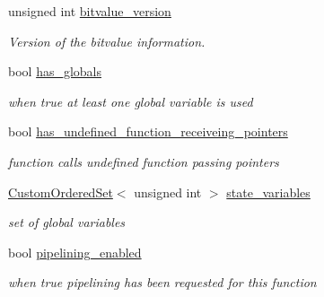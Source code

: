 \begin{DoxyCompactItemize}
unsigned int \hyperlink{classFunctionBehavior_aa15033642ac2f45870432b2ca8fae3de}{bitvalue\+\_\+version}
\begin{DoxyCompactList}\small\item\em Version of the bitvalue information. \end{DoxyCompactList}\item 
bool \hyperlink{classFunctionBehavior_a1dd60208e508751be9dc4d13c7afd1db}{has\+\_\+globals}
\begin{DoxyCompactList}\small\item\em when true at least one global variable is used \end{DoxyCompactList}\item 
bool \hyperlink{classFunctionBehavior_aa3f83e3d41707b404a4cbad317061013}{has\+\_\+undefined\+\_\+function\+\_\+receiveing\+\_\+pointers}
\begin{DoxyCompactList}\small\item\em function calls undefined function passing pointers \end{DoxyCompactList}\item 
\hyperlink{classCustomOrderedSet}{Custom\+Ordered\+Set}$<$ unsigned int $>$ \hyperlink{classFunctionBehavior_a3c944212c997d99ad71abc0afc7a72ee}{state\+\_\+variables}
\begin{DoxyCompactList}\small\item\em set of global variables \end{DoxyCompactList}\item 
bool \hyperlink{classFunctionBehavior_a8e15531441e9ce43c33eb178ecc5b660}{pipelining\+\_\+enabled}
\begin{DoxyCompactList}\small\item\em when true pipelining has been requested for this function \end{DoxyCompactList}\end{DoxyCompactItemize}
